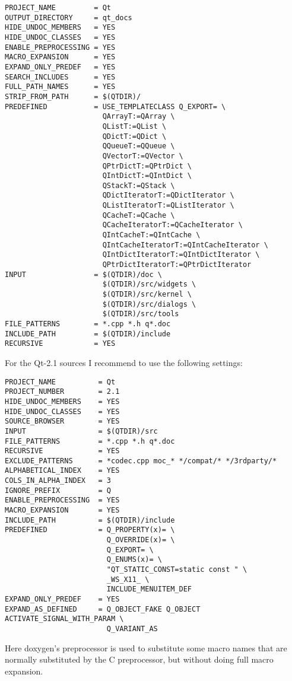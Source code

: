\footnotesize\begin{verbatim}
PROJECT_NAME         = Qt
OUTPUT_DIRECTORY     = qt_docs
HIDE_UNDOC_MEMBERS   = YES
HIDE_UNDOC_CLASSES   = YES
ENABLE_PREPROCESSING = YES
MACRO_EXPANSION      = YES
EXPAND_ONLY_PREDEF   = YES
SEARCH_INCLUDES      = YES
FULL_PATH_NAMES      = YES
STRIP_FROM_PATH      = $(QTDIR)/
PREDEFINED           = USE_TEMPLATECLASS Q_EXPORT= \
                       QArrayT:=QArray \
                       QListT:=QList \
                       QDictT:=QDict \
                       QQueueT:=QQueue \
                       QVectorT:=QVector \
                       QPtrDictT:=QPtrDict \
                       QIntDictT:=QIntDict \
                       QStackT:=QStack \
                       QDictIteratorT:=QDictIterator \
                       QListIteratorT:=QListIterator \
                       QCacheT:=QCache \
                       QCacheIteratorT:=QCacheIterator \
                       QIntCacheT:=QIntCache \
                       QIntCacheIteratorT:=QIntCacheIterator \
                       QIntDictIteratorT:=QIntDictIterator \
                       QPtrDictIteratorT:=QPtrDictIterator
INPUT                = $(QTDIR)/doc \
                       $(QTDIR)/src/widgets \
                       $(QTDIR)/src/kernel \
                       $(QTDIR)/src/dialogs \
                       $(QTDIR)/src/tools
FILE_PATTERNS        = *.cpp *.h q*.doc
INCLUDE_PATH         = $(QTDIR)/include 
RECURSIVE            = YES
\end{verbatim}
\normalsize


For the Qt-2.1 sources I recommend to use the following settings: 

\footnotesize\begin{verbatim}
PROJECT_NAME          = Qt
PROJECT_NUMBER        = 2.1
HIDE_UNDOC_MEMBERS    = YES
HIDE_UNDOC_CLASSES    = YES
SOURCE_BROWSER        = YES
INPUT                 = $(QTDIR)/src
FILE_PATTERNS         = *.cpp *.h q*.doc
RECURSIVE             = YES
EXCLUDE_PATTERNS      = *codec.cpp moc_* */compat/* */3rdparty/*
ALPHABETICAL_INDEX    = YES
COLS_IN_ALPHA_INDEX   = 3
IGNORE_PREFIX         = Q
ENABLE_PREPROCESSING  = YES
MACRO_EXPANSION       = YES
INCLUDE_PATH          = $(QTDIR)/include
PREDEFINED            = Q_PROPERTY(x)= \
                        Q_OVERRIDE(x)= \
                        Q_EXPORT= \
                        Q_ENUMS(x)= \
                        "QT_STATIC_CONST=static const " \
                        _WS_X11_ \
                        INCLUDE_MENUITEM_DEF
EXPAND_ONLY_PREDEF    = YES
EXPAND_AS_DEFINED     = Q_OBJECT_FAKE Q_OBJECT ACTIVATE_SIGNAL_WITH_PARAM \
                        Q_VARIANT_AS
\end{verbatim}
\normalsize


Here doxygen's preprocessor is used to substitute some macro names that are normally substituted by the C preprocessor, but without doing full macro expansion. 